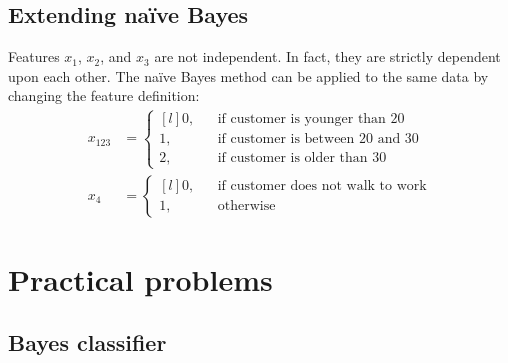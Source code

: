 \documentclass[a4paper,11pt]{article}
\begin{document}
\subsection{Extending na\"ive Bayes}
Features $x_1$, $x_2$, and $x_3$ are not independent. In fact, they are strictly dependent upon each other. The na\"ive Bayes method can be applied to the same data by changing the feature definition:
\begin{align*}
  x_{123} &= \left\{
    \begin{matrix*}[l]
      0, & & \textrm{if customer is younger than 20}\\
      1, & & \textrm{if customer is between 20 and 30}\\
      2, & & \textrm{if customer is older than 30}
    \end{matrix*}
  \right.\\
  x_4 &= \left\{
    \begin{matrix*}[l]
      0, & & \textrm{if customer does not walk to work}\\
      1, & & \textrm{otherwise}
    \end{matrix*}
  \right.
\end{align*}

\section{Practical problems}
\subsection{Bayes classifier}
\end{document}
